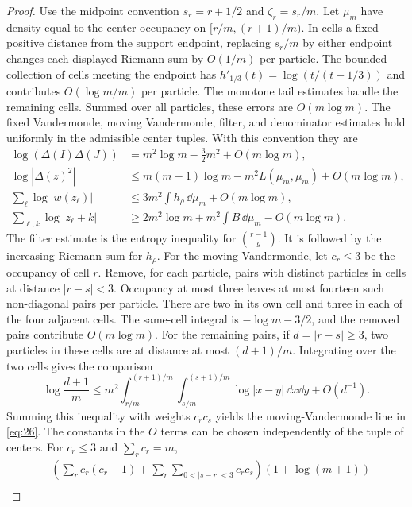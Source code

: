 \begin{proof}
Use the midpoint convention $s_r=r+1/2$ and
$\zeta_r=s_r/m$. Let $\mu_m$ have density equal to the center occupancy on
$[r/m,(r+1)/m)$. In cells a fixed positive distance from the support endpoint,
replacing $s_r/m$ by either endpoint changes each displayed Riemann sum by
$O(1/m)$ per particle. The bounded collection of cells meeting the endpoint
has $h'_{1/3}(t)=\log(t/(t-1/3))$ and contributes
$O(\log m/m)$ per particle. The monotone tail estimates handle the remaining
cells. Summed over all particles, these errors are $O(m\log m)$.
The fixed Vandermonde, moving Vandermonde, filter, and denominator
estimates hold uniformly in the admissible center tuples. With this
convention they are
\begin{equation}
\begin{aligned}
 \log(\Delta(I)\Delta(J))
   &=m^2\log m-\frac32m^2+O(m\log m),\\
 \log|\Delta(z)^2|
   &\le m(m-1)\log m-m^2L(\mu_m,\mu_m)+O(m\log m),\\
 \sum_\ell\log|w(z_\ell)|
   &\le3m^2\int h_\rho\,\dd\mu_m+O(m\log m),\\
 \sum_{\ell,k}\log|z_\ell+k|
   &\ge2m^2\log m+m^2\int B\,\dd\mu_m-O(m\log m).
\end{aligned}                                             \label{eq:26}
\end{equation}
The filter estimate is the entropy inequality for $\binom{r-1}{g}$. It is
followed by the increasing Riemann sum for $h_\rho$. For the moving
Vandermonde, let $c_r\le3$ be the occupancy of cell $r$. Remove, for each
particle, pairs with distinct particles in cells at distance $|r-s|<3$.
Occupancy at most three leaves at most fourteen such non-diagonal pairs per
particle. There are two in its own cell and three in each of the four
adjacent cells.
The same-cell integral is $-\log m-3/2$, and the removed pairs contribute
$O(m\log m)$. For the remaining pairs, if $d=|r-s|\ge3$, two particles in these cells are at distance at most
$(d+1)/m$. Integrating over the two cells gives the comparison
\[
 \log\frac{d+1}{m}\le
 m^2\!\int_{r/m}^{(r+1)/m}\!\int_{s/m}^{(s+1)/m}
       \log|x-y|\,\dd x\dd y+O(d^{-1}).
\] Summing this inequality with
weights $c_rc_s$ yields the moving-Vandermonde line in \eqref{eq:26}.
The constants in the $O$ terms can be chosen independently of the tuple of
centers. For $c_r\le3$ and $\sum_rc_r=m$,
\[
 \begin{aligned}
 &\left(\sum_r c_r(c_r-1)+
       \sum_r\sum_{0<|s-r|<3}c_rc_s\right)(1+\log(m+1))\\[-2pt]

\end{aligned}\]
\end{proof}

